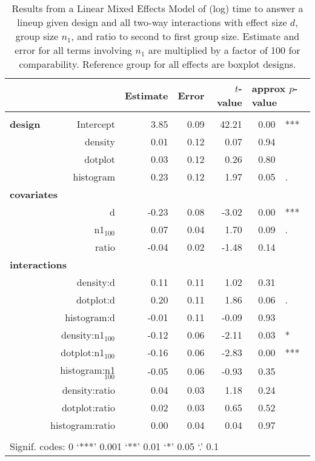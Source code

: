 \begin{table}[ht]
\begin{center}
\resizebox{\linewidth}{!} {
\begin{tabular}{lrrrrrl}
  \hline
& & Estimate & Error & $t$-value & \multicolumn{2}{l}{approx $p$-value} \\   \hline
\\[-8pt]
\bf design& Intercept & 3.85 & 0.09 & 42.21 & 0.00 & ***\\ 
&  density & 0.01 & 0.12 & 0.07 & 0.94 \\ 
&  dotplot & 0.03 & 0.12 & 0.26 & 0.80 \\ 
&  histogram & 0.23 & 0.12 & 1.97 & 0.05 & . \\ [2pt]
\multicolumn{2}{l}{\bf covariates}\\
&      d & -0.23 & 0.08 & -3.02 & 0.00 & ***\\ [1pt]
&    n1$_{100}$ & 0.07 & 0.04 & 1.70 & 0.09 & .\\ [1pt]
&  ratio & -0.04 & 0.02 & -1.48 & 0.14  \\ [2pt]
\multicolumn{2}{l}{\bf interactions}\\
&  density:d & 0.11 & 0.11 & 1.02 & 0.31 \\ 
&  dotplot:d & 0.20 & 0.11 & 1.86 & 0.06 & .  \\ 
&  histogram:d & -0.01 & 0.11 & -0.09 & 0.93 \\ [1pt]
&  density:n1$_{100}$ & -0.12 & 0.06 & -2.11 & 0.03 & *\\ 
&  dotplot:n1$_{100}$ & -0.16 & 0.06 & -2.83 & 0.00 & ***\\ 
&  histogram:n1$_{100}$ & -0.05 & 0.06 & -0.93 & 0.35 \\ [1pt]
&  density:ratio & 0.04 & 0.03 & 1.18 & 0.24 \\ 
&  dotplot:ratio & 0.02 & 0.03 & 0.65 & 0.52 \\ 
&  histogram:ratio & 0.00 & 0.04 & 0.04 & 0.97 \\ 
   \hline
\\[-5pt]
   \multicolumn{5}{l}{Signif. codes:  0 `***' 0.001 `**' 0.01 `*' 0.05 `.' 0.1}
\end{tabular}}
\end{center}
\vspace{-0.2in}
\caption{\label{tbl:speed2}Results from a Linear Mixed Effects Model of (log) time to answer a lineup given design and all two-way interactions with effect size $d$, group size $n_1$, and ratio to second to first group size. Estimate and error for all terms involving $n_1$ are multiplied by a factor of 100 for comparability.
Reference group for all effects are boxplot designs. }
\end{table}

